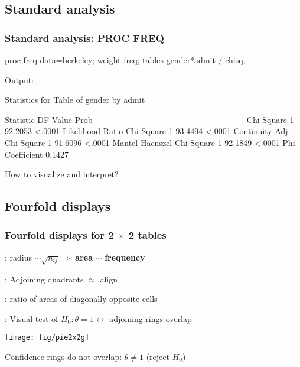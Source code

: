 \subsection{Standard analysis}
\begin{frame}[fragile]
 \frametitle{Standard analysis: PROC FREQ}

\begin{Input}
 proc freq data=berkeley;
   weight freq;
   tables gender*admit / chisq;
\end{Input}
 Output:
\begin{Output}[gobble=7,baselinestretch=.8]
               Statistics for Table of gender by admit

       Statistic                     DF       Value      Prob
       ------------------------------------------------------
       Chi-Square                     1     92.2053    <.0001
       Likelihood Ratio Chi-Square    1     93.4494    <.0001
       Continuity Adj. Chi-Square     1     91.6096    <.0001
       Mantel-Haenszel Chi-Square     1     92.1849    <.0001
       Phi Coefficient                       0.1427          
\end{Output}
 How to visualize and interpret?
\end{frame}

\subsection{Fourfold displays}
\begin{frame}
 \frametitle{Fourfold displays for 2 $\times$ 2 tables}
 \begin{itemize*}
 \item {}: radius $\sim \sqrt{n_{ij}} \Rightarrow$
 \textbf{area} $\sim$ \textbf{frequency}
 \item {}: Adjoining quadrants $\approx$ align
 \item {}: ratio of areas of diagonally opposite cells
 \item {}: Visual test of 
 $H_0 : \theta = 1 \leftrightarrow$ \alert{adjoining rings overlap}

 \begin{center}
   \texttt{[image: fig/pie2x2g]}
 \end{center}
 \item Confidence rings do not overlap: $\theta \neq 1$  (reject $H_0$)
 \end{itemize*}
\end{frame}

